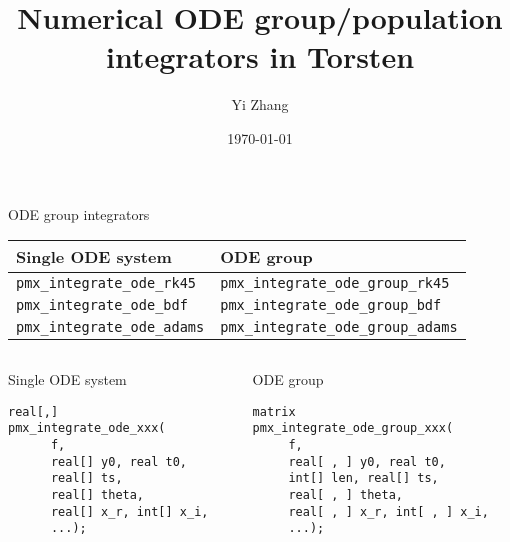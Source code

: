 \documentclass[presentation]{beamer}
\author{Yi Zhang}
\date{\today}
\title{Numerical ODE group/population integrators in Torsten}
\begin{document}
\maketitle

\begin{frame}[fragile,label={sec:org498f494}]{ODE group integrators}
 \begin{center}
\begin{tabular}{ll}
Single ODE system & ODE group\\
\hline
\texttt{pmx\_integrate\_ode\_rk45} & \texttt{pmx\_integrate\_ode\_group\_rk45}\\
\texttt{pmx\_integrate\_ode\_bdf} & \texttt{pmx\_integrate\_ode\_group\_bdf}\\
\texttt{pmx\_integrate\_ode\_adams} & \texttt{pmx\_integrate\_ode\_group\_adams}\\
\end{tabular}

\end{center}

\begin{columns}
\begin{column}{0.45\columnwidth}
\begin{block}{Single ODE system}
\begin{verbatim}
real[,]
pmx_integrate_ode_xxx(
      f,
      real[] y0, real t0,
      real[] ts,
      real[] theta,
      real[] x_r, int[] x_i,
      ...);
\end{verbatim}
\end{block}
\end{column}

\begin{column}{0.55\columnwidth}
\begin{block}{ODE group}
\begin{verbatim}
matrix
pmx_integrate_ode_group_xxx(
     f,
     real[ , ] y0, real t0,
     int[] len, real[] ts,
     real[ , ] theta,
     real[ , ] x_r, int[ , ] x_i,
     ...);
\end{verbatim}
\end{block}
\end{column}
\end{columns}
\end{frame}
\end{document}
